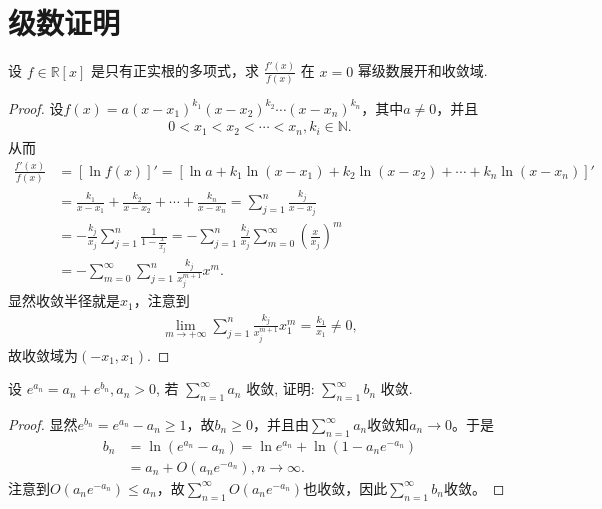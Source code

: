 \documentclass[../../main.tex]{subfiles}%
\begin{document}
\section{级数证明}

\begin{example}
设 $f \in \mathbb{R}[x]$ 是只有正实根的多项式，求 $\frac{f'(x)}{f(x)}$ 在 $x = 0$ 幂级数展开和收敛域.
\end{example}
\begin{proof}

设$f(x) =a(x-x_1)^{k_1}(x-x_2)^{k_2}\cdots(x-x_n)^{k_n}$，其中$a\ne 0$，并且
\begin{align*}
0<x_1<x_2<\cdots <x_n,k_i\in \mathbb{N}.
\end{align*}
从而
\begin{align*}
\frac{f'(x)}{f(x)}&=\left[ \ln f(x) \right]'=\left[ \ln a+k_1\ln(x-x_1)+k_2\ln(x-x_2)+\cdots +k_n\ln(x-x_n) \right]' \\
&=\frac{k_1}{x-x_1}+\frac{k_2}{x-x_2}+\cdots +\frac{k_n}{x-x_n} =\sum\limits_{j=1}^n{\frac{k_j}{x-x_j}}\\
&=-\frac{k_j}{x_j}\sum\limits_{j=1}^n{\frac{1}{1-\frac{x}{x_j}}} =-\sum\limits_{j=1}^n{\frac{k_j}{x_j}\sum\limits_{m=0}^{\infty}{\left( \frac{x}{x_j} \right)^m}}\\
&=-\sum\limits_{m=0}^{\infty}{\sum\limits_{j=1}^n{\frac{k_j}{x_j^{m+1}}}x^m}.
\end{align*}
显然收敛半径就是$x_1$，注意到
\begin{align*}
\lim_{m\rightarrow +\infty}\sum_{j=1}^n{\frac{k_j}{x_j^{m+1}}}x_1^m=\frac{k_1}{x_1}\ne 0,
\end{align*}
故收敛域为$(-x_1,x_1)$.

\end{proof}

\begin{example}
设 $e^{a_n} = a_n + e^{b_n},a_n > 0$, 若 $\sum\limits_{n=1}^{\infty}a_n$ 收敛, 证明: $\sum\limits_{n=1}^{\infty}b_n$ 收敛.
\end{example}
\begin{proof}

显然$e^{b_n}=e^{a_n}-a_n\geqslant 1$，故$b_n\geqslant 0$，并且由$\sum_{n=1}^{\infty}a_n$收敛知$a_n\rightarrow 0$。于是
\begin{align*}
b_n&=\ln\left( e^{a_n}-a_n \right)=\ln e^{a_n}+\ln\left( 1-a_ne^{-a_n} \right)\\
&=a_n+O\left( a_ne^{-a_n} \right),n\rightarrow \infty.
\end{align*}
注意到$O\left( a_ne^{-a_n} \right)\leqslant a_n$，故$\sum_{n=1}^{\infty}O\left( a_ne^{-a_n} \right)$也收敛，因此$\sum_{n=1}^{\infty}b_n$收敛。

\end{proof}
\end{document}
